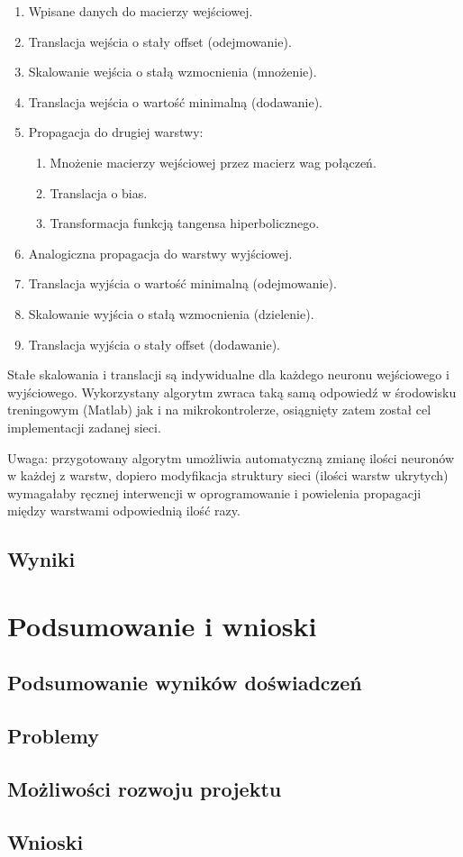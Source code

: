 \documentclass[12pt, a4paper]{article}
\begin{document}
\begin{enumerate}
    \item Wpisane danych do macierzy wejściowej.
	\item Translacja wejścia o stały offset (odejmowanie).
	\item Skalowanie wejścia o stałą wzmocnienia (mnożenie).
	\item Translacja wejścia o wartość minimalną (dodawanie).
	\item Propagacja do drugiej warstwy:
	\begin{enumerate}
		\item Mnożenie macierzy wejściowej przez macierz wag połączeń.
		\item Translacja o bias.
		\item Transformacja funkcją tangensa hiperbolicznego.
	\end{enumerate}
	\item Analogiczna propagacja do warstwy wyjściowej.
	\item Translacja wyjścia o wartość minimalną (odejmowanie).
	\item Skalowanie wyjścia o stałą wzmocnienia (dzielenie).
	\item Translacja wyjścia o stały offset (dodawanie).
\end{enumerate}

Stałe skalowania i translacji są indywidualne dla każdego neuronu wejściowego i wyjściowego. Wykorzystany algorytm zwraca taką samą odpowiedź w środowisku treningowym (Matlab) jak i na mikrokontrolerze, osiągnięty zatem został cel implementacji zadanej sieci. 

Uwaga: przygotowany algorytm umożliwia automatyczną zmianę ilości neuronów w każdej z warstw, dopiero modyfikacja struktury sieci (ilości warstw ukrytych) wymagałaby ręcznej interwencji w oprogramowanie i powielenia propagacji między warstwami odpowiednią ilość razy.

\FloatBarrier

\subsection{Wyniki}

\section{Podsumowanie i wnioski}
\subsection{Podsumowanie wyników doświadczeń}
\subsection{Problemy}
\subsection{Możliwości rozwoju projektu}
\subsection{Wnioski}
\end{document}
